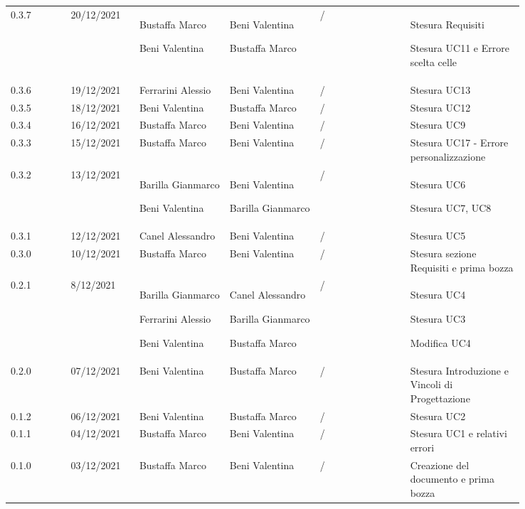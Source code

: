 {\begin{tabular}{p{0.10\linewidth}p{0.10\linewidth}p{0.15\linewidth}p{0.15\linewidth}p{0.15\linewidth}p{0.19\linewidth}}
	\rowcolor[RGB]{216, 235, 171}
	0.3.7 & 20/12/2021 & Bustaffa Marco \par Beni Valentina & Beni Valentina \par Bustaffa Marco & /& Stesura Requisiti \par Stesura UC11 e Errore scelta celle\\
	\rowcolor[RGB]{233, 245, 206}
	0.3.6 & 19/12/2021 & Ferrarini Alessio& Beni Valentina &/& Stesura UC13\\
	\rowcolor[RGB]{216, 235, 171}
	0.3.5 & 18/12/2021 & Beni Valentina& Bustaffa Marco &/& Stesura UC12\\
	\rowcolor[RGB]{233, 245, 206}
	0.3.4 & 16/12/2021 & Bustaffa Marco& Beni Valentina &/& Stesura UC9\\
	\rowcolor[RGB]{216, 235, 171}
	0.3.3 & 15/12/2021 & Bustaffa Marco& Beni Valentina &/& Stesura UC17 - Errore personalizzazione\\
	\rowcolor[RGB]{233, 245, 206}
	0.3.2 & 13/12/2021 & Barilla Gianmarco \par Beni Valentina& Beni Valentina \par Barilla Gianmarco &/& Stesura UC6 \par Stesura UC7, UC8\\
	\rowcolor[RGB]{216, 235, 171}
	0.3.1 & 12/12/2021 & Canel Alessandro& Beni Valentina &/& Stesura UC5\\
	\rowcolor[RGB]{233, 245, 206}
	0.3.0 & 10/12/2021 & Bustaffa Marco& Beni Valentina &/& Stesura sezione Requisiti e prima bozza\\
	\rowcolor[RGB]{216, 235, 171}
	0.2.1 & 8/12/2021 & Barilla Gianmarco \par Ferrarini Alessio \par Beni Valentina& Canel Alessandro \par Barilla Gianmarco \par Bustaffa Marco&/& Stesura UC4 \par Stesura UC3 \par Modifica UC4 \\
	\rowcolor[RGB]{233, 245, 206}
	0.2.0 & 07/12/2021 & Beni Valentina& Bustaffa Marco &/& Stesura Introduzione e Vincoli di Progettazione\\
	\rowcolor[RGB]{216, 235, 171}
	0.1.2 & 06/12/2021 & Beni Valentina& Bustaffa Marco &/& Stesura UC2\\
	\rowcolor[RGB]{233, 245, 206}
	0.1.1 & 04/12/2021 & Bustaffa Marco& Beni Valentina &/& Stesura UC1 e relativi errori\\
	\rowcolor[RGB]{216, 235, 171}
	0.1.0 & 03/12/2021 & Bustaffa Marco& Beni Valentina &/& Creazione del documento e prima bozza\\
\end{tabular}
}
